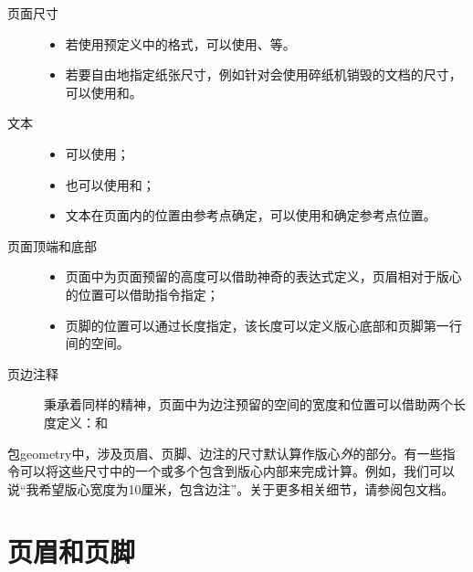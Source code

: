 \begin{description}
    \item[页面尺寸]%
    
\begin{itemize}
    \item 若使用预定义中的格式，可以使用、等。
    \item 若要自由地指定纸张尺寸，例如针对会使用碎纸机销毁的文档的尺寸，可以使用和。
\end{itemize}

\item[文本]

\begin{itemize}
    \item 可以使用；
    \item 也可以使用和；
    \item 文本在页面内的位置由参考点确定，可以使用和确定参考点位置。
\end{itemize}

\item[页面顶端和底部]

\begin{itemize}
    \item 页面中为页面预留的高度可以借助神奇的表达式定义，页眉相对于版心的位置可以借助指令指定；
    \item 页脚的位置可以通过长度指定，该长度可以定义版心底部和页脚第一行间的空间。
\end{itemize}

\item[页边注释] 秉承着同样的精神，页面中为边注预留的空间的宽度和位置可以借助两个长度定义：和
\end{description}

\begin{exclamation}
包geometry中，涉及页眉、页脚、边注的尺寸默认算作版心\emph{外}的部分。有一些指令可以将这些尺寸中的一个或多个包含到版心内部来完成计算。例如，我们可以说“我希望版心宽度为10厘米，包含边注”。关于更多相关细节，请参阅包文档。
\end{exclamation}

\section{页眉和页脚}

